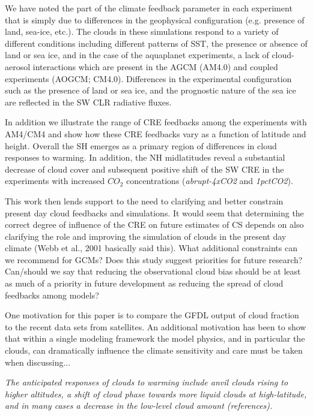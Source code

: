 \documentclass[draft]{agujournal2019}
\begin{document}
We have noted the part of the climate feedback parameter in each experiment that is simply due to differences in the 
geophysical configuration (e.g. presence of land, sea-ice, etc.).  
The clouds in these simulations respond to a variety of different conditions including different
patterns of SST, the presence or absence of land or sea ice, and in the case of the aquaplanet
experiments, a lack of cloud-aerosol interactions which are present in the AGCM (AM4.0) and coupled 
experiments (AOGCM; CM4.0).  Differences in the experimental configuration such as the presence of land or sea ice, and 
the prognostic nature of the sea ice are reflected in the SW CLR radiative fluxes.  

In addition we illustrate the range of CRE feedbacks among the 
experiments with AM4/CM4 and show how these CRE feedbacks vary as a function of latitude and height.  
Overall the SH emerges as a  primary 
region of differences in cloud responses to warming.  In addition, the NH midlatitudes reveal a substantial decrease of cloud cover and 
subsequent positive shift of the SW CRE in the experiments with increased $CO_2$ concentrations (\textit{abrupt-4xCO2} and \textit{1pctCO2}).


This work then lends support to the need to clarifying and better constrain present day cloud feedbacks and simulations.  It would seem that 
determining the correct degree of influence of the CRE on future estimates of CS depends on also clarifying the role and improving the 
simulation of clouds in the present day climate (Webb et al., 2001 basically said this).
What additional constraints can we recommend for GCMs?   Does this study suggest priorities for future research?
Can/should we say that reducing the observational cloud bias
should be at least as much of a priority in future development as reducing the spread of cloud feedbacks among
models?  



One motivation for this paper is to compare the GFDL output of cloud fraction to the recent data sets from satellites.  An additional 
motivation has been to show that within a single modeling framework the model physics, and in particular the clouds, can dramatically 
influence the climate sensitivity and care must be taken when discussing...

\textit{The anticipated responses of clouds to warming include anvil clouds rising to higher altitudes, a 
shift of cloud phase towards more liquid clouds at high-latitude, and in many cases a decrease in the 
low-level cloud amount (references).} 
\end{document}
